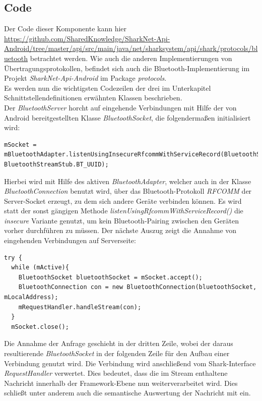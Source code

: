 \subsection{Code}
Der Code dieser Komponente kann hier \url{https://github.com/SharedKnowledge/SharkNet-Api-Android/tree/master/api/src/main/java/net/sharksystem/api/shark/protocols/bluetooth} betrachtet werden. Wie auch die anderen Implementierungen von Übertragungsprotokollen, befindet sich auch die Bluetooth-Implementierung im Projekt \textit{SharkNet-Api-Android} im Package \textit{protocols}. 
\\Es werden nun die wichtigsten Codezeilen der drei im Unterkapitel Schnittstellendefinitionen erwähnten Klassen beschrieben.
\\Der \textit{BluetoothServer} horcht auf eingehende Verbindungen mit Hilfe der von Android bereitgestellten Klasse \textit{BluetoothSocket}, die folgendermaßen initialisiert wird:
 \lstset{language=Java, caption=Initialisierung des Bluetooth-Server-Sockets, label=DescriptiveLabel, numbers=left, numbersep=1em, breaklines=true, basicstyle=\small}
\begin{lstlisting}
mSocket = mBluetoothAdapter.listenUsingInsecureRfcommWithServiceRecord(BluetoothStreamStub.BT_NAME, BluetoothStreamStub.BT_UUID);
\end{lstlisting}
Hierbei wird mit Hilfe des aktiven \textit{BluetoothAdapter}, welcher auch in der Klasse \textit{BluetoothConnection} benutzt wird, über das Bluetooth-Protokoll \textit{RFCOMM} der Server-Socket erzeugt, zu dem sich andere Geräte verbinden können. Es wird statt der sonst gängigen Methode \textit{listenUsingRfcommWithServiceRecord()} die \textit{insecure} Variante genutzt, um kein Bluetooth-Pairing zwischen den Geräten vorher durchführen zu müssen. Der nächste Auszug zeigt die Annahme von eingehenden Verbindungen auf Serverseite:
 \lstset{language=Java, caption=Serverseitige Annahme der Bluetooth-Verbindungen (Auszug), label=DescriptiveLabel, numbers=left, numbersep=1em, breaklines=true, basicstyle=\small}
\begin{lstlisting}
try {
  while (mActive){
    BluetoothSocket bluetoothSocket = mSocket.accept();
    BluetoothConnection con = new BluetoothConnection(bluetoothSocket, mLocalAddress);
    mRequestHandler.handleStream(con);
  }
  mSocket.close();
\end{lstlisting}
Die Annahme der Anfrage geschieht in der dritten Zeile, wobei der daraus resultierende \textit{BluetoothSocket} in der folgenden Zeile für den Aufbau einer Verbindung genutzt wird. Die Verbindung wird anschließend vom Shark-Interface \textit{RequestHandler} verwertet. Dies bedeutet, dass die im Stream enthaltene Nachricht innerhalb der Framework-Ebene nun weiterverarbeitet wird. Dies schließt unter anderem auch die semantische Auswertung der Nachricht mit ein.
